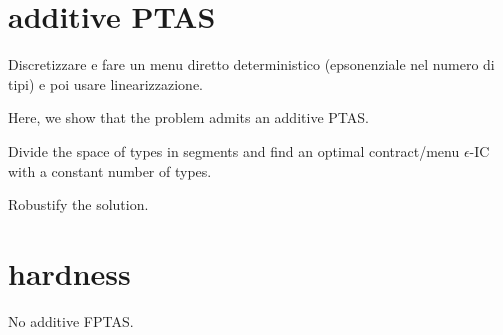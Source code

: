 \section{additive PTAS}

Discretizzare e fare un menu diretto deterministico (epsonenziale nel numero di tipi) e poi usare linearizzazione.

Here, we show that the problem admits an additive PTAS.

Divide the space of types in segments and find an optimal contract/menu $\epsilon$-IC with a constant number of types.

Robustify the solution.



\section{hardness}

\begin{theorem}
	No additive FPTAS.
\end{theorem}

